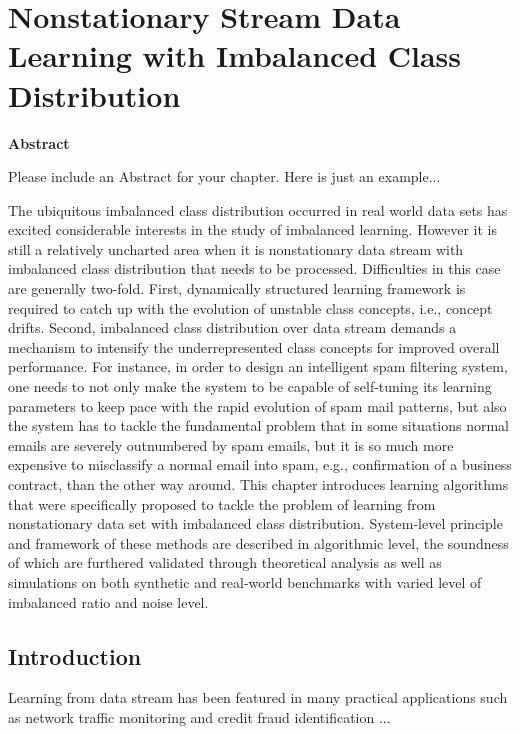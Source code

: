 \documentclass{wileySix}
\begin{document}

\chapter{Nonstationary Stream Data Learning with Imbalanced Class Distribution}

\noindent\textbf{Abstract}

Please include an Abstract for your chapter. Here is just an example...

The ubiquitous imbalanced class distribution occurred in real world data sets has
excited considerable interests in the study of imbalanced learning. However it
is still a relatively uncharted area when it is nonstationary data stream with imbalanced
class distribution that needs to be processed. Difficulties in this case
are generally two-fold. First, dynamically structured learning framework is required
to catch up with the evolution of unstable class concepts, i.e., concept drifts.
Second, imbalanced class distribution over data stream demands a mechanism to
intensify the underrepresented class concepts for improved overall performance.
For instance, in order to design an intelligent spam filtering system, one needs
to not only make the system to be capable of self-tuning its learning parameters
to keep pace with the rapid evolution of spam mail patterns, but also the system
has to tackle the fundamental problem that in some situations normal emails
are severely outnumbered by spam emails, but it is so much more expensive to
misclassify a normal email into spam, e.g., confirmation of a business contract,
than the other way around. This chapter introduces learning algorithms that were
specifically proposed to tackle the problem of learning from nonstationary data set
with imbalanced class distribution. System-level principle and framework of these
methods are described in algorithmic level, the soundness of which are furthered
validated through theoretical analysis as well as simulations on both synthetic and
real-world benchmarks with varied level of imbalanced ratio and noise level.

\section{Introduction}
Learning from data stream has been featured in many practical applications such as network traffic
monitoring and credit fraud identification \cite{Grossberg:1988}...
\end{document}
